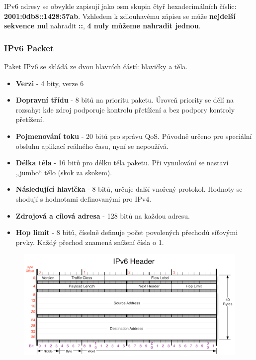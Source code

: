 IPv6 adresy se obvykle zapisují jako osm skupin čtyř hexadecimálních číslic: \textbf{2001:0db8::1428:57ab}. Vzhledem k zdlouhavému zápisu se může \textbf{nejdelší sekvence nul} nahradit \textbf{::}, \textbf{4 nuly můžeme nahradit jednou}.

\subsubsection{IPv6 Packet}
Paket IPv6 se skládá ze dvou hlavních částí: hlavičky a těla.
\begin{itemize}
	\item \textbf{Verzi} - 4 bity, verze 6
	\item \textbf{Dopravní třídu} - 8 bitů na prioritu paketu. Úroveň priority se dělí na rozsahy: kde zdroj podporuje kontrolu přetížení a bez podpory kontroly přetížení.
	\item \textbf{Pojmenování toku} - 20 bitů pro správu QoS. Původně určeno pro speciální obsluhu aplikací reálného času, nyní se nepoužívá.
	\item \textbf{Délka těla} - 16 bitů pro délku těla paketu. Při vynulování se nastaví „jumbo“ tělo (skok za skokem).
	\item \textbf{Následující hlavička} - 8 bitů, určuje další vnořený protokol. Hodnoty se shodují s hodnotami definovanými pro IPv4.
	\item \textbf{Zdrojová a cílová adresa} - 128 bitů na každou adresu.
	\item\textbf{Hop limit }- 8 bitů, číselně definuje počet povolených přechodů síťovými prvky. Každý přechod znamená snížení čísla o 1.
\end{itemize}

\begin{figure}[H]
	\centering
	\includegraphics[width=\textwidth]{assets/4_ipv6}
\end{figure}


